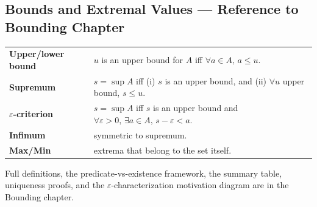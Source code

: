 %
%
%

\subsection{Bounds and Extremal Values --- Reference to Bounding Chapter}

\begin{tcolorbox}[colback=gray!6, colframe=gray!40, arc=2pt,
  left=6pt, right=6pt, top=4pt, bottom=4pt,
  title={\small\textbf{Definitions and results from the Bounding chapter}},
  fonttitle=\small\bfseries]
\begin{tabular}{@{}p{}p{}@{}}
\textbf{Upper/lower bound} &
  $u$ is an upper bound for $A$ iff $\forall a \in A,\, a \le u$. \\[0.3em]
\textbf{Supremum} &
  $s = \sup A$ iff (i) $s$ is an upper bound, and
  (ii) $\forall u$ upper bound, $s \le u$. \\[0.3em]
\textbf{$\varepsilon$-criterion} &
  $s = \sup A$ iff $s$ is an upper bound and
  $\forall \varepsilon > 0,\, \exists a \in A,\, s - \varepsilon < a$. \\[0.3em]
\textbf{Infimum} & symmetric to supremum. \\[0.3em]
\textbf{Max/Min} & extrema that belong to the set itself. \\
\end{tabular}

\medskip
Full definitions, the predicate-vs-existence framework, the summary table,
uniqueness proofs, and the $\varepsilon$-characterization motivation diagram
are in the Bounding chapter.
\end{tcolorbox}
